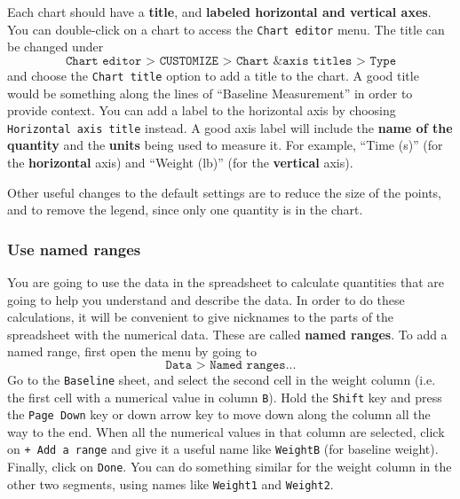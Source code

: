Each chart should have a \textbf{title}, and \textbf{labeled horizontal and vertical axes}. You can double-click on a chart to access the \texttt{Chart editor} menu. The title can be changed under
\begin{equation}
    \texttt{Chart editor > CUSTOMIZE > Chart \& axis titles > Type}
\end{equation}
and choose the \texttt{Chart title} option to add a title to the chart. A good title would be something along the lines of ``Baseline Measurement'' in order to provide context. You can add a label to the horizontal axis by choosing \texttt{Horizontal axis title} instead. A good axis label will include the \textbf{name of the quantity} and the \textbf{units} being used to measure it. For example, ``Time (s)'' (for the \textbf{horizontal} axis) and ``Weight (lb)'' (for the \textbf{vertical} axis).

Other useful changes to the default settings are to reduce the size of the points, and to remove the legend, since only one quantity is in the chart.
\subsubsection{Use named ranges}
You are going to use the data in the spreadsheet to calculate quantities that are going to help you understand and describe the data. In order to do these calculations, it will be convenient to give nicknames to the parts of the spreadsheet with the numerical data. These are called \textbf{named ranges}. To add a named range, first open the menu by going to
\begin{equation}
    \texttt{Data > Named ranges...}
\end{equation}
Go to the \texttt{Baseline} sheet, and select the second cell in the weight column (i.e. the first cell with a numerical value in column \texttt{B}). Hold the \texttt{Shift} key and press the \texttt{Page Down} key or down arrow key to move down along the column all the way to the end. When all the numerical values in that column are selected, click on \texttt{+ Add a range} and give it a useful name like \texttt{WeightB} (for baseline weight). Finally, click on \texttt{Done}. You can do something similar for the weight column in the other two segments, using names like \texttt{Weight1} and \texttt{Weight2}.
